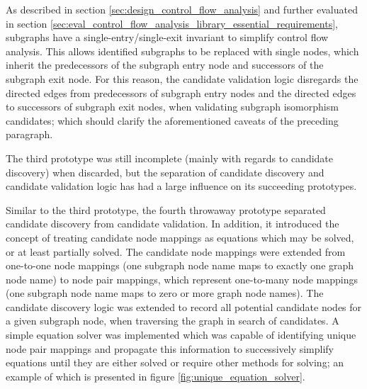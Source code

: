 As described in section \ref{sec:design_control_flow_analysis} and further evaluated in section \ref{sec:eval_control_flow_analysis_library_essential_requirements}, subgraphs have a single-entry/single-exit invariant to simplify control flow analysis. This allows identified subgraphs to be replaced with single nodes, which inherit the predecessors of the subgraph entry node and successors of the subgraph exit node. For this reason, the candidate validation logic disregards the directed edges from predecessors of subgraph entry nodes and the directed edges to successors of subgraph exit nodes, when validating subgraph isomorphism candidates; which should clarify the aforementioned caveats of the preceding paragraph.

The third prototype was still incomplete (mainly with regards to candidate discovery) when discarded, but the separation of candidate discovery and candidate validation logic has had a large influence on its succeeding prototypes.

Similar to the third prototype, the fourth throwaway prototype separated candidate discovery from candidate validation. In addition, it introduced the concept of treating candidate node mappings as equations which may be solved, or at least partially solved. The candidate node mappings were extended from one-to-one node mappings (one subgraph node name maps to exactly one graph node name) to node pair mappings, which represent one-to-many node mappings (one subgraph node name maps to zero or more graph node names). The candidate discovery logic was extended to record all potential candidate nodes for a given subgraph node, when traversing the graph in search of candidates. A simple equation solver was implemented which was capable of identifying unique node pair mappings and propagate this information to successively simplify equations until they are either solved or require other methods for solving; an example of which is presented in figure \ref{fig:unique_equation_solver}.

